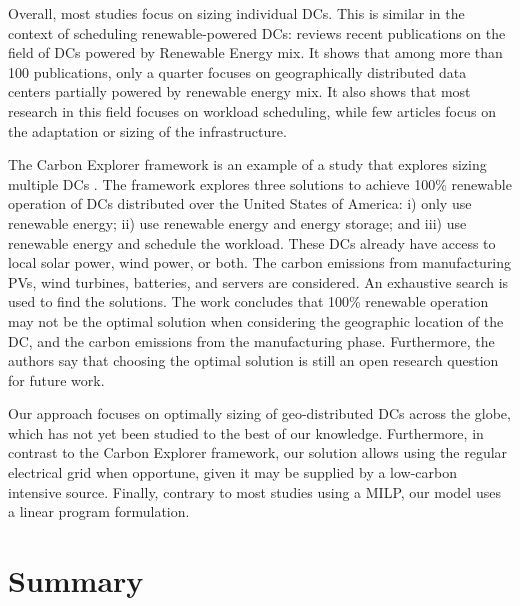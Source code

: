 Overall, most studies focus on sizing individual DCs. This is similar in the context of scheduling renewable-powered DCs: \citet{SONG2022326} reviews recent publications on the field of DCs powered by Renewable Energy mix. It shows that among more than 100 publications, only a quarter focuses on geographically distributed data centers partially powered by renewable energy mix. It also shows that most research in this field focuses on workload scheduling, while few articles focus on the adaptation or sizing of the infrastructure.


The Carbon Explorer framework is an example of a study that explores sizing multiple DCs \cite{acun2022holistic}. The framework explores three solutions to achieve 100\% renewable operation of DCs distributed over the United States of America: i) only use renewable energy; ii) use renewable energy and energy storage; and iii) use renewable energy and schedule the workload. These DCs already have access to local solar power, wind power, or both. The carbon emissions from manufacturing PVs, wind turbines, batteries, and servers are considered. An exhaustive search is used to find the solutions. The work concludes that 100\% renewable operation may not be the optimal solution when considering the geographic location of the DC, and the carbon emissions from the manufacturing phase. Furthermore, the authors say that choosing the optimal solution is still an open research question for future work.



Our approach focuses on optimally sizing of geo-distributed DCs across the globe, which has not yet been studied to the best of our knowledge. Furthermore, in contrast to the Carbon Explorer framework, our solution allows using the regular electrical grid when opportune, given it may be supplied by a low-carbon intensive source. Finally, contrary to most studies using a MILP, our model uses a linear program formulation.






\section{Summary}

